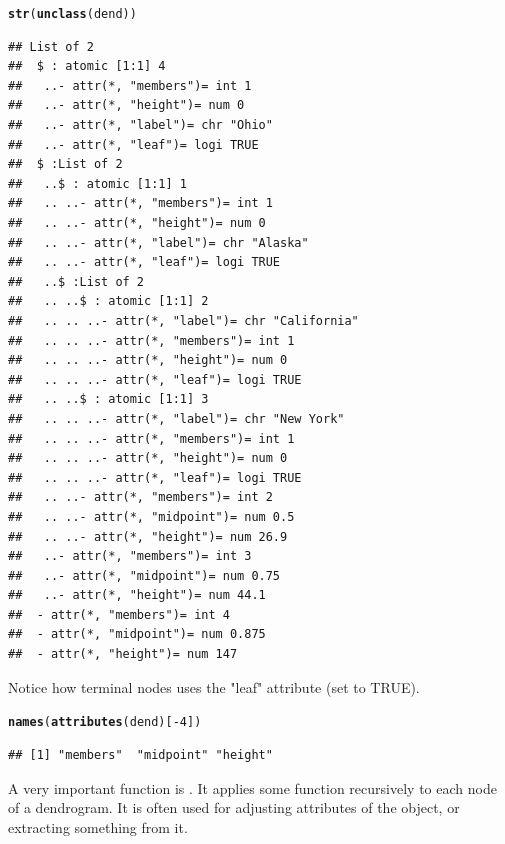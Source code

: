 \documentclass[shortnames,nojss,article]{jss}\usepackage[]{graphicx}\usepackage[]{color}
\makeatletter
\newcommand{\hlnum}[1]{\textcolor[rgb]{0.686,0.059,0.569}{#1}}%
\newcommand{\hlopt}[1]{\textcolor[rgb]{0,0,0}{#1}}%
\newcommand{\hlstd}[1]{\textcolor[rgb]{0.345,0.345,0.345}{#1}}%
\newcommand{\hlkwd}[1]{\textcolor[rgb]{0.737,0.353,0.396}{\textbf{#1}}}%
\newenvironment{kframe}{%
 \def\at@end@of@kframe{}%
 \ifinner\ifhmode%
  \def\at@end@of@kframe{\end{minipage}}%
  \begin{minipage}{\columnwidth}%
 \fi\fi%
 \def\FrameCommand##1{\hskip\@totalleftmargin \hskip-\fboxsep
 \colorbox{shadecolor}{##1}\hskip-\fboxsep
     \hskip-\linewidth \hskip-\@totalleftmargin \hskip\columnwidth}%
 \MakeFramed {\advance\hsize-\width
   \@totalleftmargin\z@ \linewidth\hsize
   \@setminipage}}%
 {\par\unskip\endMakeFramed%
 \at@end@of@kframe}
\newenvironment{knitrout}{}{} %
\makeatother
\begin{document}
\begin{knitrout}
\color{fgcolor}\begin{kframe}
\begin{alltt}
\hlkwd{str}\hlstd{(}\hlkwd{unclass}\hlstd{(dend))}
\end{alltt}
\begin{verbatim}
## List of 2
##  $ : atomic [1:1] 4
##   ..- attr(*, "members")= int 1
##   ..- attr(*, "height")= num 0
##   ..- attr(*, "label")= chr "Ohio"
##   ..- attr(*, "leaf")= logi TRUE
##  $ :List of 2
##   ..$ : atomic [1:1] 1
##   .. ..- attr(*, "members")= int 1
##   .. ..- attr(*, "height")= num 0
##   .. ..- attr(*, "label")= chr "Alaska"
##   .. ..- attr(*, "leaf")= logi TRUE
##   ..$ :List of 2
##   .. ..$ : atomic [1:1] 2
##   .. .. ..- attr(*, "label")= chr "California"
##   .. .. ..- attr(*, "members")= int 1
##   .. .. ..- attr(*, "height")= num 0
##   .. .. ..- attr(*, "leaf")= logi TRUE
##   .. ..$ : atomic [1:1] 3
##   .. .. ..- attr(*, "label")= chr "New York"
##   .. .. ..- attr(*, "members")= int 1
##   .. .. ..- attr(*, "height")= num 0
##   .. .. ..- attr(*, "leaf")= logi TRUE
##   .. ..- attr(*, "members")= int 2
##   .. ..- attr(*, "midpoint")= num 0.5
##   .. ..- attr(*, "height")= num 26.9
##   ..- attr(*, "members")= int 3
##   ..- attr(*, "midpoint")= num 0.75
##   ..- attr(*, "height")= num 44.1
##  - attr(*, "members")= int 4
##  - attr(*, "midpoint")= num 0.875
##  - attr(*, "height")= num 147
\end{verbatim}
\end{kframe}
\end{knitrout}



Notice how terminal nodes uses the "leaf" attribute (set to TRUE).
\begin{knitrout}
\color{fgcolor}\begin{kframe}
\begin{alltt}
\hlkwd{names}\hlstd{(}\hlkwd{attributes}\hlstd{(dend)[}\hlopt{-}\hlnum{4}\hlstd{])}
\end{alltt}
\begin{verbatim}
## [1] "members"  "midpoint" "height"
\end{verbatim}
\end{kframe}
\end{knitrout}




A very important function is . It applies some function recursively to each node of a dendrogram. It is often used for adjusting attributes of the object, or extracting something from it. 
\end{document}

